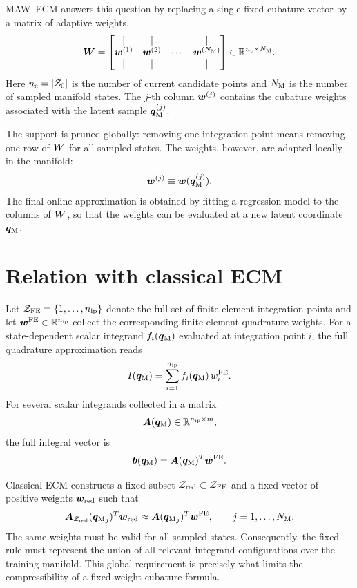 \documentclass[11pt,a4paper]{article}
\begin{document}
MAW--ECM answers this question by replacing a single fixed cubature vector by a
matrix of adaptive weights,
\[
        \bm W =
        \begin{bmatrix}
        | & | &        & | \\
        \bm w^{(1)} & \bm w^{(2)} & \cdots & \bm w^{(N_{\mathrm{M}})} \\
        | & | &        & |
        \end{bmatrix}
        \in \mathbb{R}^{n_{\mathrm{c}} \times N_{\mathrm{M}}}.
\]
Here $n_{\mathrm{c}} = |\mathcal{Z}_{0}|$ is the number of current candidate points and $N_{\mathrm{M}}$ is
the number of sampled manifold states. The $j$-th column
$\bm w^{(j)}$ contains the cubature weights associated with the latent sample
$\bm q_{\mathrm{M}}^{(j)}$.

The support is pruned globally: removing one integration point means removing
one row of $\bm W$ for all sampled states. The weights, however, are adapted
locally in the manifold:
\[
        \bm w^{(j)} \equiv \bm w(\bm q_{\mathrm{M}}^{(j)}).
\]
The final online approximation is obtained by fitting a regression model to the
columns of $\bm W$, so that the weights can be evaluated at a new latent
coordinate $\bm q_{\mathrm{M}}$.

\section{Relation with classical ECM}

Let $\mathcal{Z}_{\mathrm{FE}}=\{1,\ldots,n_{\mathrm{ip}}\}$ denote the full set of finite element integration
points and let $\bm w^{\mathrm{FE}}\in\mathbb{R}^{n_{\mathrm{ip}}}$ collect the corresponding finite element
quadrature weights. For a state-dependent scalar integrand
$f_i(\bm q_{\mathrm{M}})$ evaluated at integration point $i$, the full quadrature approximation
reads
\[
        I(\bm q_{\mathrm{M}})
        =
        \sum_{i=1}^{n_{\mathrm{ip}}} f_i(\bm q_{\mathrm{M}})\,w^{\mathrm{FE}}_i .
\]
For several scalar integrands collected in a matrix
\[
        \bm A(\bm q_{\mathrm{M}})\in\mathbb{R}^{n_{\mathrm{ip}}\times m},
\]
the full integral vector is
\[
        \bm b(\bm q_{\mathrm{M}})
        =
        \bm A(\bm q_{\mathrm{M}})^T \bm w^{\mathrm{FE}} .
\]

Classical ECM constructs a fixed subset $\mathcal{Z}_{\mathrm{red}}\subset\mathcal{Z}_{\mathrm{FE}}$ and a fixed vector
of positive weights $\bm w_{\mathrm{red}}$ such that
\[
        \bm A_{\mathcal{Z}_{\mathrm{red}}}({\bm q_{\mathrm{M}}}_j)^T\bm w_{\mathrm{red}}
        \approx
        \bm A({\bm q_{\mathrm{M}}}_j)^T\bm w^{\mathrm{FE}},
        \qquad
        j=1,\ldots,N_{\mathrm{M}} .
\]
The same weights must be valid for all sampled states. Consequently, the fixed
rule must represent the union of all relevant integrand configurations over the
training manifold. This global requirement is precisely what limits the
compressibility of a fixed-weight cubature formula.
\end{document}
